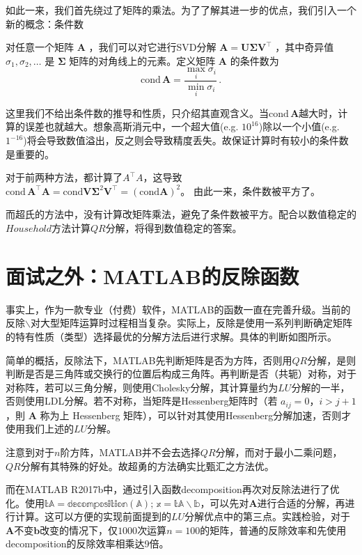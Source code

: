 如此一来，我们首先绕过了矩阵的乘法。为了了解其进一步的优点，我们引入一个新的概念：条件数
\begin{definition}
	对任意一个矩阵 $\boldsymbol A$ ，我们可以对它进行SVD分解 $\boldsymbol A = \boldsymbol U \boldsymbol \Sigma \boldsymbol  V^\top$ ，其中奇异值 $\sigma_1, \sigma_2, \ldots$  是 $\boldsymbol \Sigma$ 矩阵的对角线上的元素。定义矩阵 $\boldsymbol A$ 的条件数为
	\[\mathrm{cond}\, \boldsymbol A = \frac{\max_i\sigma_i}{\min_i \sigma_i} \,. \]
\end{definition}

这里我们不给出条件数的推导和性质，只介绍其直观含义。当$\mathrm{cond}\, \boldsymbol A$越大时，计算的误差也就越大。想象高斯消元中，一个超大值(e.g. $10^{16}$)除以一个小值(e.g. $1^{-16}$)将会导致数值溢出，反之则会导致精度丢失。故保证计算时有较小的条件数是重要的。

对于前两种方法，都计算了$A^\top A$，这导致$\mathrm{cond}\, \boldsymbol A^\top \boldsymbol A = \mathrm{cond}\boldsymbol V\boldsymbol\Sigma^2\boldsymbol V^\top = (\mathrm{cond} \boldsymbol A)^2$。 由此一来，条件数被平方了。

而超氏的方法中，没有计算改矩阵乘法，避免了条件数被平方。配合以数值稳定的$Household$方法计算$QR$分解，将得到数值稳定的答案。

\section{面试之外：MATLAB的反除函数}
事实上，作为一款专业（付费）软件，MATLAB的函数一直在完善升级。当前的反除$\backslash$对大型矩阵运算时过程相当复杂。实际上，反除是使用一系列判断确定矩阵的特有性质（类型）选择最优的分解方法后进行求解。具体的判断如图所示。

简单的概括，反除法下，MATLAB先判断矩阵是否为方阵，否则用$QR$分解，是则判断是否是三角阵或交换行的位置后构成三角阵。再判断是否（共轭）对称，对于对称阵，若可以三角分解，则使用Cholesky分解，其计算量约为$LU$分解的一半，否则使用LDL分解。若不对称，当矩阵是Hessenberg矩阵时（若 $a_{ij}=0， i>j+1$，則 $\boldsymbol A$ 称为上 Hessenberg 矩阵），可以针对其使用Hessenberg分解加速，否则才使用我们上述的$LU$分解。

注意到对于$n$阶方阵，MATLAB并不会去选择$QR$分解，而对于最小二乘问题，$QR$分解有其特殊的好处。故超勇的方法确实比甄汇之方法优。

而在MATLAB R2017b中，通过引入函数decomposition再次对反除法进行了优化。使用$\mathbb{tA=decomposition(A);\,x=tA\backslash b}$，可以先对$\boldsymbol A$进行合适的分解，再进行计算。这可以方便的实现前面提到的$LU$分解优点中的第三点。实践检验，对于$\boldsymbol A$不变$\boldsymbol b$改变的情况下，仅$1000$次运算$n=100$的矩阵，普通的反除效率和先使用decomposition的反除效率相乘达9倍。

